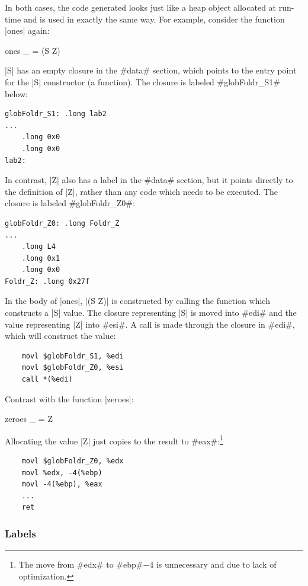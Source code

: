 \documentclass[11pt]{article}
\begin{document}
In both cases, the code generated looks just like a heap object
allocated at run-time and is used in exactly the same way. For
example, consider the function |ones| again:

\begin{code}
ones _ = (S Z)  
\end{code}

\noindent
|S| has an empty closure in the #data# section, which points to the
entry point for the |S| constructor (a function). The closure is
labeled #globFoldr_S1# below:

\begin{verbatim}
globFoldr_S1: .long lab2
...
    .long 0x0
    .long 0x0
lab2:
\end{verbatim}

\noindent
In contrast, |Z| also has a label in the #data# section, but it
points directly to the definition of |Z|, rather than any code which
needs to be executed. The closure is labeled #globFoldr_Z0#:

\begin{verbatim}
globFoldr_Z0: .long Foldr_Z
...
    .long L4
    .long 0x1
    .long 0x0
Foldr_Z: .long 0x27f
\end{verbatim}

In the body of |ones|, |(S Z)| is constructed by calling the function
which constructs a |S| value. The closure representing |S| is moved
into #edi# and the value representing |Z| into #esi#. A call is made
through the closure in #edi#, which will construct the value:

\begin{verbatim}
    movl $globFoldr_S1, %edi
    movl $globFoldr_Z0, %esi
    call *(%edi)
\end{verbatim}

\noindent
Contrast with the function |zeroes|:

\begin{code}
zeroes _ = Z
\end{code}

\noindent
Allocating the value |Z| just copies to the result to
#eax#:\footnote{The move from #edx# to #ebp#$ - 4$ is unnecessary
  and due to lack of optimization.}

\begin{verbatim}
    movl $globFoldr_Z0, %edx
    movl %edx, -4(%ebp)
    movl -4(%ebp), %eax
    ...
    ret
\end{verbatim}

\subsubsection{Labels}
\end{document}
